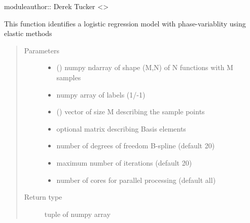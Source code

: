 \documentclass[letterpaper,10pt,english]{sphinxmanual}
\begin{document}
moduleauthor:: Derek Tucker \textless{}\textgreater{}

\begin{fulllineitems}
\label{\detokenize{regression:regression.elastic_logistic}}
This function identifies a logistic regression model with
phase-variablity using elastic methods
\begin{quote}\begin{description}
\item[{Parameters}] \leavevmode\begin{itemize}
\item {} 
 () \textendash{} numpy ndarray of shape (M,N) of N functions with M samples

\item {} 
 \textendash{} numpy array of labels (1/-1)

\item {} 
 () \textendash{} vector of size M describing the sample points

\item {} 
 \textendash{} optional matrix describing Basis elements

\item {} 
 \textendash{} number of degrees of freedom B-spline (default 20)

\item {} 
 \textendash{} maximum number of iterations (default 20)

\item {} 
 \textendash{} number of cores for parallel processing (default all)

\end{itemize}

\item[{Return type}] \leavevmode
tuple of numpy array


\end{description}
\end{quote}
\end{fulllineitems}
\end{document}
